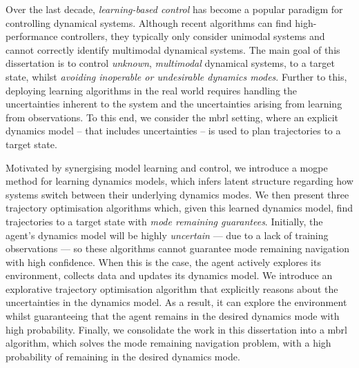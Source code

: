 \documentclass{mimosis-class/mimosis}
\numberwithin{equation}{chapter}
\begin{document}
\label{sec:org132f7bc}
\setcounter{page}{1}
\begin{singlespace}
Over the last decade, \textit{learning-based control} has become a popular paradigm for controlling dynamical systems.
Although recent algorithms can find high-performance controllers, they typically only consider unimodal systems and
cannot correctly identify multimodal dynamical systems.
The main goal of this dissertation is to control \textit{unknown},
\textit{multimodal} dynamical systems, to a target state, whilst \textit{avoiding inoperable or undesirable dynamics modes}.
Further to this, deploying learning algorithms in the real world requires handling the uncertainties
inherent to the system and the uncertainties arising from learning from observations.
To this end, we consider the \acrfull{mbrl} setting, where an explicit dynamics model -- that includes uncertainties -- is used to plan trajectories to a target state.

Motivated by synergising model learning and control, we introduce a \acrfull{mogpe} method for learning
dynamics models, which infers latent structure regarding how systems switch between their underlying dynamics modes.
We then present three trajectory optimisation algorithms which, given this learned dynamics model, find trajectories
to a target state with \textit{mode remaining guarantees}.
Initially, the agent’s dynamics model will be highly \textit{uncertain} — due to a lack of training observations — so these algorithms cannot guarantee mode remaining navigation with high confidence.
When this is the case, the agent actively explores its environment, collects data and updates its dynamics model.
We introduce an explorative trajectory optimisation algorithm that explicitly reasons about
the uncertainties in the dynamics model.
As a result, it can explore the environment whilst guaranteeing that the agent remains in
the desired dynamics mode with high probability.
Finally, we consolidate the work in this dissertation into a \acrshort{mbrl} algorithm, which solves the mode remaining navigation problem, with a high probability of remaining in the desired dynamics mode.
\end{singlespace}
\end{document}
